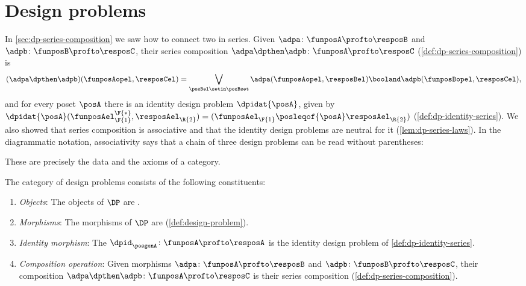 
\section[Design problems]{Design problems}
\label{sec:dp-category}

In \cref{sec:dp-series-composition} we saw how to connect two  in series.
Given $\adpa \colon \funposA \profto \resposB$ and $\adpb \colon \funposB \profto \resposC$, their series composition $\adpa \dpthen \adpb \colon \funposA \profto \resposC$ (\cref{def:dp-series-composition}) is
\begin{equation}
    (\adpa \dpthen \adpb)(\funposAopel, \resposCel)
    =
    \bigvee_{\posBel \setin \posBset}
    \adpa(\funposAopel,\resposBel)
    \booland
    \adpb(\funposBopel,\resposCel),
\end{equation}
and for every poset $\posA$ there is an identity design problem $\dpidat{\posA}$, given by $\dpidat{\posA}(\funposAel_\F{1}^\F{*}, \resposAel_\R{2}) = (\funposAel_\F{1} \posleqof{\posA} \resposAel_\R{2})$ (\cref{def:dp-identity-series}).
We also showed that series composition is associative and that the identity design problems are neutral for it (\cref{lem:dp-series-laws}).
In the diagrammatic notation, associativity says that a chain of three design problems can be read without parentheses:

These are precisely the data and the axioms of a category.

\begin{definition}
    \label{def:DP}
    The category of design problems \DP consists of the following constituents:
    \begin{enumerate}
        \item \emph{Objects}: The objects of $\DP$ are .
        \item \emph{Morphisms}: The morphisms of $\DP$ are  (\cref{def:design-problem}).
        \item \emph{Identity morphism}: The  $\dpid_\posgenA \colon \funposA \profto \resposA$ is the identity design problem of \cref{def:dp-identity-series}.
        \item \emph{Composition operation}: Given morphisms $\adpa \colon \funposA \profto \resposB$ and $\adpb \colon \funposB \profto \resposC$, their composition $\adpa \dpthen \adpb\colon \funposA\profto \resposC$ is their series composition (\cref{def:dp-series-composition}).
    \end{enumerate}
\end{definition}

